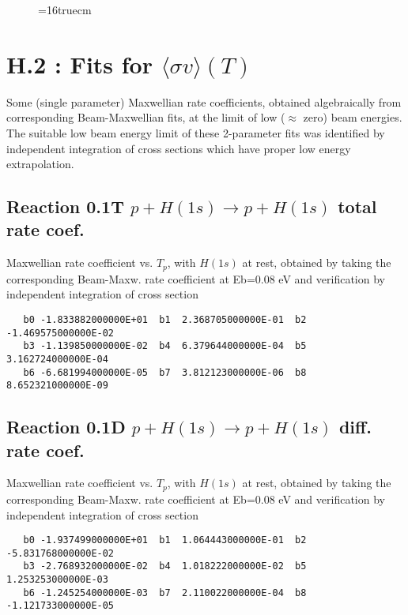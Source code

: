 \documentclass[12pt,dvipdfmx]{article}
\begin{document}
\begin{figure} \label{0.4}
\epsfxsize=16truecm
\end{figure}
\newpage

\section{H.2 : Fits for $\langle\sigma v \rangle (T)$} \label{sect2}

Some (single parameter) Maxwellian rate coefficients, obtained algebraically from corresponding
Beam-Maxwellian fits, at the limit of low ($\approx$ zero) beam energies. The suitable low beam energy limit
of these 2-parameter fits was identified by independent integration of cross sections which have proper
low energy extrapolation.

\subsection{
Reaction 0.1T  $p + H(1s) \rightarrow p + H(1s)$ total rate coef.
}
Maxwellian rate coefficient vs. $T_p$, with $H(1s)$ at rest, obtained by taking
the corresponding Beam-Maxw. rate coefficient at Eb=0.08 eV and
verification by independent integration of cross section

\begin{small}\begin{verbatim}
   b0 -1.833882000000E+01  b1  2.368705000000E-01  b2 -1.469575000000E-02
   b3 -1.139850000000E-02  b4  6.379644000000E-04  b5  3.162724000000E-04
   b6 -6.681994000000E-05  b7  3.812123000000E-06  b8  8.652321000000E-09
\end{verbatim}\end{small}


\subsection{
Reaction 0.1D  $p + H(1s) \rightarrow p + H(1s)$ diff. rate coef.
}
Maxwellian rate coefficient vs. $T_p$, with $H(1s)$ at rest, obtained by taking
the corresponding Beam-Maxw. rate coefficient at Eb=0.08 eV and
verification by independent integration of cross section
\begin{small}\begin{verbatim}
   b0 -1.937499000000E+01  b1  1.064443000000E-01  b2 -5.831768000000E-02
   b3 -2.768932000000E-02  b4  1.018222000000E-02  b5  1.253253000000E-03
   b6 -1.245254000000E-03  b7  2.110022000000E-04  b8 -1.121733000000E-05
\end{verbatim}\end{small}
\end{document}
